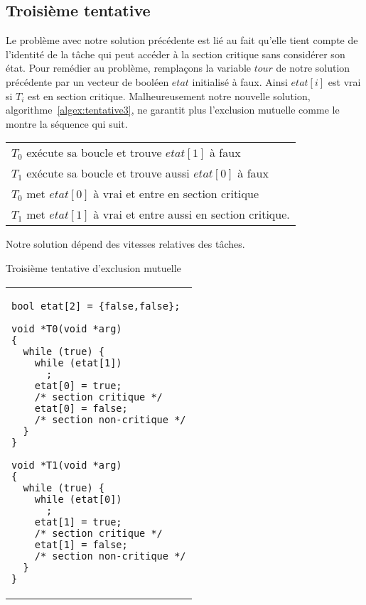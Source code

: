 \subsection*{Troisième tentative}
Le problème avec notre solution précédente est lié au fait qu'elle tient compte de l'identité de la tâche qui peut accéder à la section critique sans considérer son état.
Pour remédier au problème, remplaçons la variable $tour$ de notre solution précédente par un vecteur de booléen $etat$ initialisé à faux.
Ainsi $etat[i]$ est vrai si $T_i$ est en section critique.
Malheureusement notre nouvelle solution, algorithme~\ref{algex:tentative3}, ne garantit plus l'exclusion mutuelle comme le montre la séquence qui suit.
\par\noindent
\centering
\begin{tabular}{l}
  $T_0$ exécute sa boucle et trouve $etat[1]$ à faux             \\
  $T_1$ exécute sa boucle et trouve aussi $etat [0]$ à faux      \\
  $T_0$ met $etat[0]$ à vrai et entre en section critique        \\
  $T_1$ met $etat[1]$ à vrai et entre aussi en section critique. \\
\end{tabular}

\par\noindent
Notre solution dépend des vitesses relatives des tâches.

\begin{algorithm}[!ht]
  \caption{Troisième tentative d'exclusion mutuelle}\label{algex:tentative3}
  \centering
  \begin{tabular}{l}
    \lstset{language=C++}
    \begin{lstlisting}
bool etat[2] = {false,false};

void *T0(void *arg)
{
  while (true) {
    while (etat[1])
      ;
    etat[0] = true;
    /* section critique */
    etat[0] = false;
    /* section non-critique */
  }
}

void *T1(void *arg)
{
  while (true) {
    while (etat[0])
      ;
    etat[1] = true;
    /* section critique */
    etat[1] = false;
    /* section non-critique */
  }
}
\end{lstlisting}
  \end{tabular}

\end{algorithm}

